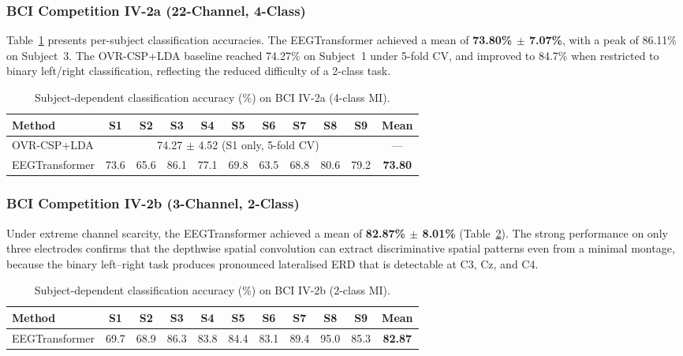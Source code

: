\documentclass[12pt, a4paper]{article}
\begin{document}
\subsubsection{BCI Competition IV-2a (22-Channel, 4-Class)}

Table~\ref{tab:iv2a_results} presents per-subject classification accuracies. The EEGTransformer achieved a mean of \textbf{73.80\% $\pm$ 7.07\%}, with a peak of 86.11\% on Subject~3. The OVR-CSP+LDA baseline reached 74.27\% on Subject~1 under 5-fold CV, and improved to 84.7\% when restricted to binary left/right classification, reflecting the reduced difficulty of a 2-class task.

\begin{table}[htbp]
\centering
\caption{Subject-dependent classification accuracy (\%) on BCI IV-2a (4-class MI).}
\label{tab:iv2a_results}
\begin{tabular}{lcccccccccc}
\toprule
\textbf{Method} & \textbf{S1} & \textbf{S2} & \textbf{S3} & \textbf{S4} & \textbf{S5} & \textbf{S6} & \textbf{S7} & \textbf{S8} & \textbf{S9} & \textbf{Mean} \\
\midrule
OVR-CSP+LDA & \multicolumn{9}{c}{74.27 $\pm$ 4.52 (S1 only, 5-fold CV)} & --- \\
EEGTransformer & 73.6 & 65.6 & 86.1 & 77.1 & 69.8 & 63.5 & 68.8 & 80.6 & 79.2 & \textbf{73.80} \\
\bottomrule
\end{tabular}
\end{table}

\subsubsection{BCI Competition IV-2b (3-Channel, 2-Class)}

Under extreme channel scarcity, the EEGTransformer achieved a mean of \textbf{82.87\% $\pm$ 8.01\%} (Table~\ref{tab:iv2b_results}). The strong performance on only three electrodes confirms that the depthwise spatial convolution can extract discriminative spatial patterns even from a minimal montage, because the binary left--right task produces pronounced lateralised ERD that is detectable at C3, Cz, and C4.

\begin{table}[htbp]
\centering
\caption{Subject-dependent classification accuracy (\%) on BCI IV-2b (2-class MI).}
\label{tab:iv2b_results}
\begin{tabular}{lcccccccccc}
\toprule
\textbf{Method} & \textbf{S1} & \textbf{S2} & \textbf{S3} & \textbf{S4} & \textbf{S5} & \textbf{S6} & \textbf{S7} & \textbf{S8} & \textbf{S9} & \textbf{Mean} \\
\midrule
EEGTransformer & 69.7 & 68.9 & 86.3 & 83.8 & 84.4 & 83.1 & 89.4 & 95.0 & 85.3 & \textbf{82.87} \\
\bottomrule
\end{tabular}
\end{table}
\end{document}
